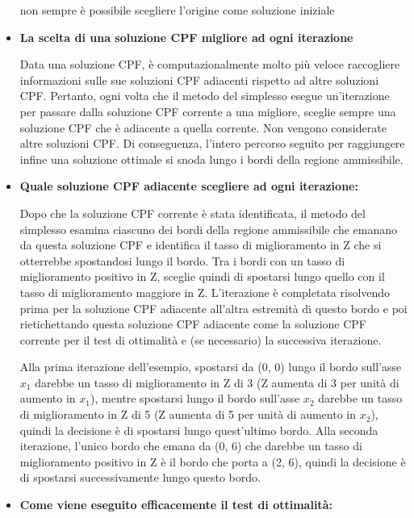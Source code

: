 \documentclass[a4paper, 11pt]{article}
\begin{document}
\begin{itemize}
                 non sempre è possibile scegliere l'origine come soluzione iniziale 
            
            \item \textbf{La scelta di una soluzione CPF migliore ad ogni iterazione}

                Data una soluzione CPF, è computazionalmente molto più veloce raccogliere informazioni sulle sue soluzioni CPF adiacenti rispetto ad altre soluzioni CPF. Pertanto, ogni volta che il metodo del simplesso esegue un'iterazione per passare dalla soluzione CPF corrente a una migliore, sceglie sempre una soluzione CPF che è adiacente a quella corrente. Non vengono considerate altre soluzioni CPF. Di conseguenza, l'intero percorso seguito per raggiungere infine una soluzione ottimale si snoda lungo i bordi della regione ammissibile.
            
            \item \textbf{Quale soluzione CPF adiacente scegliere ad ogni iterazione: }

                Dopo che la soluzione CPF corrente è stata identificata, il metodo del simplesso esamina ciascuno dei bordi della regione ammissibile che emanano da questa soluzione CPF e identifica il tasso di miglioramento in Z che si otterrebbe spostandosi lungo il bordo. Tra i bordi con un tasso di miglioramento positivo in Z, sceglie quindi di spostarsi lungo quello con il tasso di miglioramento maggiore in Z. L'iterazione è completata risolvendo prima per la soluzione CPF adiacente all'altra estremità di questo bordo e poi rietichettando questa soluzione CPF adiacente come la soluzione CPF corrente per il test di ottimalità e (se necessario) la successiva iterazione.
                
                Alla prima iterazione dell'esempio, spostarsi da (0, 0) lungo il bordo sull'asse $x_1$ darebbe un tasso di miglioramento in Z di 3 (Z aumenta di 3 per unità di aumento in $x_1$), mentre spostarsi lungo il bordo sull'asse $x_2$ darebbe un tasso di miglioramento in Z di 5 (Z aumenta di 5 per unità di aumento in $x_2$), quindi la decisione è di spostarsi lungo quest'ultimo bordo. Alla seconda iterazione, l'unico bordo che emana da (0, 6) che darebbe un tasso di miglioramento positivo in Z è il bordo che porta a (2, 6), quindi la decisione è di spostarsi successivamente lungo questo bordo.

            \item \textbf{Come viene eseguito efficacemente il test di ottimalità: }
            

\end{itemize}
\end{document}
